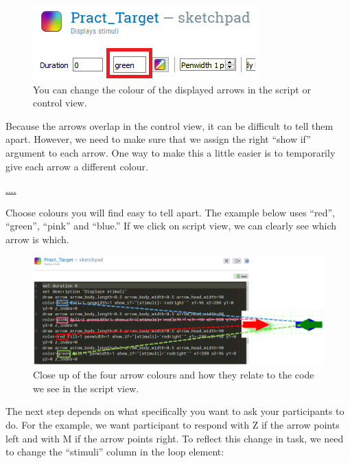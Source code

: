 \documentclass[
]{book}
\begin{document}
\begin{figure}

{\centering \includegraphics[width=0.6\linewidth]{images/changesimon/03SimonColour} 

}

\caption{You can change the colour of the displayed arrows in the script or control view.}\label{fig:Figure2-9}
\end{figure}

Because the arrows overlap in the control view, it can be difficult to tell them apart. However, we need to make sure that we assign the right ``show if'' argument to each arrow. One way to make this a little easier is to temporarily give each arrow a different colour.

\url{....}

Choose colours you will find easy to tell apart. The example below uses ``red'', ``green'', ``pink'' and ``blue.'' If we click on script view, we can clearly see which arrow is which.

\begin{figure}

{\centering \includegraphics[width=0.99\linewidth]{images/changesimon/04colours} 

}

\caption{Close up of the four arrow colours and how they relate to the code we see in the script view.}\label{fig:Figure2-11}
\end{figure}

The next step depends on what specifically you want to ask your participants to do. For the example, we want participant to respond with Z if the arrow points left and with M if the arrow points right. To reflect this change in task, we need to change the ``stimuli'' column in the loop element:
\end{document}
